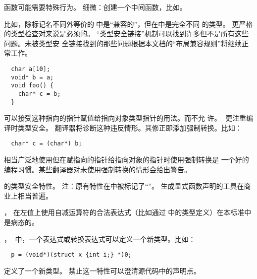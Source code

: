 \diffrat {}函数可能需要特殊行为。
\diffeff \semdel
\diffdiff 细微：创建一个中间函数，比如。
\diffuse \seldom

比如，除标记名不同外等价的在\c{}中是“兼容的”，但在\cpp{}中是完全不同
的类型。
\diffrat 更严格的类型检查对\cpp{}来说是必须的。
\diffeff \semdel
\diffdiff \semtrans “类型安全链接”机制可以找到许多但不是所有这些问题。未被类型安
全链接找到的那些问题根据本文档的“布局兼容规则”将继续正常工作。
\diffuse \common


\begin{lstlisting}
  char a[10];
  void* b = a;
  void foo() {
    char* c = b;
  }
\end{lstlisting}
\isoc{}可以接受这种指向的指针赋值给指向对象类型指针的用法。而\cpp{}不允
许。
\diffrat \cpp{}比\c{}更注重编译时类型安全。
\diffeff \semdel
\diffdiff \aut \cpp{}翻译器将诊断这种违反情形。其修正即添加强制转换。比如：
\begin{lstlisting}
  char* c = (char*) b;
\end{lstlisting}
\diffuse 相当广泛地使用但在赋指向的指针给指向对象的指针时使用强制转换是
一个好的编程习惯。某些\isoc{}翻译器对未使用强制转换的情形会给出警告。

\diffrat \cpp{}的类型安全特性。
\diffeff \semdel 注：原有特性在\isoc{}中被标记了“\obsol”。
\diffdiff \syntrans 生成显式函数声明的工具在商业上相当普遍。
\diffuse \common

，
\diffrat \semsurp
\diffeff 在左值上使用自减运算符的合法\isoc{}表达式（比如通过
中的类型定义）在本标准中是病态的。

，
在\c{}中，一个表达式或转换表达式可以定义一个新类型。比如：
\begin{lstlisting}
  p = (void*)(struct x {int i;} *)0;
\end{lstlisting}
定义了一个新类型。
\diffrat 禁止这一特性可以澄清源代码中的声明点。
\diffeff \semdel
\diffdiff \syntrans
\diffuse \seldom


